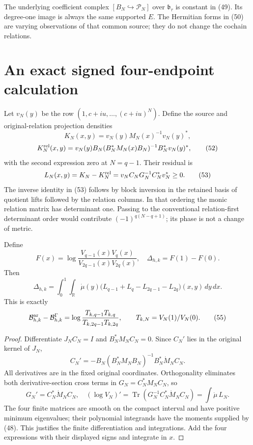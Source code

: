 The underlying coefficient complex $[B_N\hookrightarrow\mathcal P_N]$ over $\mathfrak b_\tau$ is constant in (49). Its degree-one image is always the same supported $E$. The Hermitian forms in (50) are varying observations of that common source; they do not change the cochain relations.

\section{An exact signed four-endpoint calculation}
Let $v_N(y)$ be the row $(1,c+iu,\ldots,(c+iu)^N)$. Define the source and original-relation projection densities
\[
 K_N(x,y)=v_N(y)M_N(x)^{-1}v_N(y)^*,
\]
\[
 K_N^{\rm rel}(x,y)
 =v_N(y)B_N(B_N^*M_N(x)B_N)^{-1}B_N^*v_N(y)^*,
 \tag{52}
\]
with the second expression zero at $N=q-1$. Their residual is
\[
 L_N(x,y)=K_N-K_N^{\rm rel}
  =v_NC_NG_N^{-1}C_N^*v_N^*\ge0.
 \tag{53}
\]
The inverse identity in (53) follows by block inversion in the retained basis of quotient lifts followed by the relation columns. In that ordering the monic relation matrix has determinant one. Passing to the conventional relation-first determinant order would contribute $(-1)^{q(N-q+1)}$; its phase is not a change of metric.

\begin{theorem}
Define
\[
 F(x)=\log\frac{V_{q-1}(x)V_q(x)}{V_{2q-1}(x)V_{2q}(x)},
 \quad \Delta_{h,k}=F(1)-F(0).
\]
Then
\[
 \boxed{\Delta_{h,k}
   =\int_0^1\!\int_{\mathbb R}\dot\mu(y)
       \bigl(L_{q-1}+L_q-L_{2q-1}-L_{2q}\bigr)(x,y)\,dy\,dx.}
 \tag{54}
\]
This is exactly
\[
 \mathcal B^{\rm ar}_{h,k}-\mathcal B^\Gamma_{h,k}
 =\log\frac{T_{k,q-1}T_{k,q}}{T_{k,2q-1}T_{k,2q}},
 \qquad T_{k,N}=V_N(1)/V_N(0).
 \tag{55}
\]
\end{theorem}
\begin{proof}
Differentiate $J_NC_N=I$ and $B_N^*M_NC_N=0$. Since $C_N'$ lies in the original kernel of $J_N$,
\[
 C_N'=-B_N(B_N^*M_NB_N)^{-1}B_N^*\dot M_NC_N.
 \tag{56}
\]
All derivatives are in the fixed original coordinates. Orthogonality eliminates both derivative-section cross terms in $G_N=C_N^*M_NC_N$, so
\[
 G_N'=C_N^*\dot M_NC_N,
 \quad(\log V_N)'=\operatorname{Tr}(G_N^{-1}C_N^*\dot M_NC_N)
                 =\int\dot\mu\,L_N.
 \tag{57}
\]
The four finite matrices are smooth on the compact interval and have positive minimum eigenvalues; their polynomial integrands have the moments supplied by (48). This justifies the finite differentiation and integrations. Add the four expressions with their displayed signs and integrate in $x$.
\end{proof}

